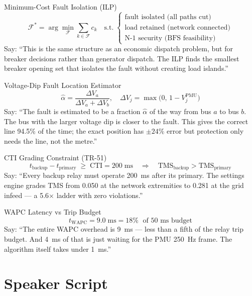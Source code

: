\documentclass[12pt,a4paper]{article}
\begin{document}
\begin{formulabox}{Minimum-Cost Fault Isolation (ILP)}
\[
  \mathcal{F}^* = \arg\min_{\mathcal{F}} \sum_{k \in \mathcal{F}} c_k
  \quad \text{s.t.}\;
  \begin{cases}
    \text{fault isolated (all paths cut)} \\
    \text{load retained (network connected)} \\
    \text{N-1 security (BFS feasibility)}
  \end{cases}
\]
Say: ``This is the same structure as an economic dispatch problem, but for breaker decisions rather than generator dispatch. The ILP finds the smallest breaker opening set that isolates the fault without creating load islands.''
\end{formulabox}

\begin{formulabox}{Voltage-Dip Fault Location Estimator}
\[
  \hat{\alpha} = \frac{\Delta V_a}{\Delta V_a + \Delta V_b},
  \quad \Delta V_j = \max\!\bigl(0,\, 1 - V_j^\mathrm{PMU}\bigr)
\]
Say: ``The fault is estimated to be a fraction $\hat{\alpha}$ of the way from bus $a$ to bus $b$. The bus with the larger voltage dip is closer to the fault. This gives the correct line 94.5\% of the time; the exact position has $\pm 24\%$ error but protection only needs the line, not the metre.''
\end{formulabox}

\begin{formulabox}{CTI Grading Constraint (TR-51)}
\[
  t_\mathrm{backup} - t_\mathrm{primary} \;\geq\; \mathrm{CTI} = 200\;\text{ms}
  \quad \Longrightarrow \quad
  \mathrm{TMS}_\mathrm{backup} > \mathrm{TMS}_\mathrm{primary}
\]
Say: ``Every backup relay must operate 200~ms after its primary. The settings engine grades TMS from 0.050 at the network extremities to 0.281 at the grid infeed — a 5.6$\times$ ladder with zero violations.''
\end{formulabox}

\begin{formulabox}{WAPC Latency vs Trip Budget}
\[
  t_\mathrm{WAPC} = 9.0\;\text{ms} = 18\%\;\text{ of 50~ms budget}
\]
Say: ``The entire WAPC overhead is 9~ms — less than a fifth of the relay trip budget. And 4~ms of that is just waiting for the PMU 250~Hz frame. The algorithm itself takes under 1~ms.''
\end{formulabox}

\section{Speaker Script}
\end{document}
